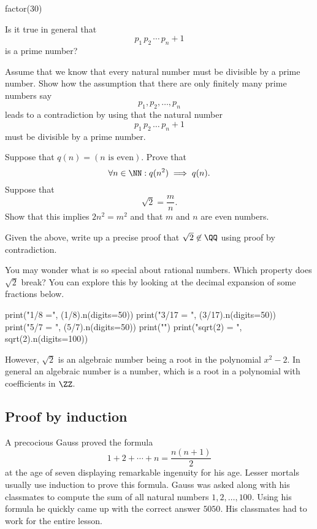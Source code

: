 \documentclass{article}
\begin{document}
\begin{sage}
  factor(30)
\end{sage}

Is it true in general that
$$
p_1\, p_2\, \cdots \, p_n + 1
$$
is a prime number?

Assume that we know that every natural number must be divisible by a prime number. Show how the
assumption that there are only finitely many prime numbers say
$$
p_1, p_2, \dots, p_n
$$
leads to a contradiction by using that the natural number
$$
p_1\, p_2\, \dots\, p_n + 1
$$
must be divisible by a prime number.
\endshex

\beginshex\label{exsqrt2notrat}
Suppose that $q(n) = (n \text{ is even})$. Prove that
$$
\forall n\in \NN: q(n^2) \implies q(n).
$$
Suppose that
$$
\sqrt{2} = \frac{m}{n}.
$$
Show that this implies $2 n^2 = m^2$ and that $m$ and $n$ are even numbers.

Given the above, write up a precise proof that $\sqrt{2}\not\in \QQ$
using proof by contradiction.

You may wonder what is so special about rational numbers. Which property does
$\sqrt{2}$ break? You can explore this by looking at the decimal expansion of
some fractions below.

\begin{sage}
print("1/8 =", (1/8).n(digits=50))
print("3/17 = ", (3/17).n(digits=50))
print("5/7 = ", (5/7).n(digits=50))
print("")
print("sqrt(2) = ", sqrt(2).n(digits=100))
\end{sage}

However, $\sqrt{2}$ is an algebraic number being a root in the
polynomial $x^2 - 2$. In general an algebraic number is a number,
which is a root in a polynomial with coefficients in $\ZZ$.

\endshex


\subsection{Proof by induction}

A precocious Gauss proved the formula
\begin{equation}\label{gaussind}
1 + 2 + \cdots + n = \frac{n(n+1)}{2}
\end{equation}
at the age of seven displaying remarkable ingenuity for his age. Lesser
mortals usually use induction to prove this formula. Gauss was asked
along with his classmates to compute the sum of all natural numbers
$1, 2, \dots, 100$. Using his formula he quickly came up with the correct
answer $5050$. His classmates had to work for the entire lesson.
\end{document}
